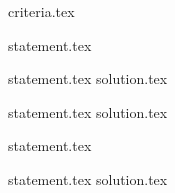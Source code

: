 {criteria.tex}

{statement.tex}

{statement.tex}
{solution.tex}

{statement.tex}
{solution.tex}

{statement.tex}

{statement.tex}
{solution.tex}
